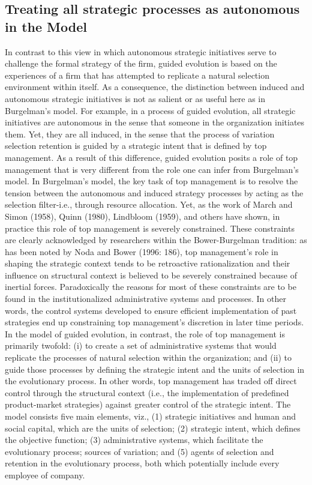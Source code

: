 \documentclass[12pt,letterpaper]{article}
\begin{document}
\subsection{Treating all strategic processes as autonomous in the \cite{Lovas2000} Model}
In contrast to this view in which autonomous strategic initiatives serve to challenge the formal strategy of the firm, guided evolution is based on the experiences of a firm that has attempted to replicate a natural selection environment within itself. As a consequence, the distinction between induced and autonomous strategic initiatives is not as salient or as useful here as in Burgelman's model. For example, in a process of guided evolution, all strategic initiatives are autonomous in the sense that someone in the organization
initiates them. Yet, they are all induced, in the sense that the process of variation selection retention is guided by a strategic intent that is
defined by top management. As a result of this difference, guided evolution posits a role of top management that is very different from the role one can infer from Burgelman's model. In Burgelman's model, the key task of top management is to resolve the tension between the autonomous and induced strategy processes by acting as the selection filter-i.e., through resource allocation. Yet, as the work of
March and Simon (1958), Quinn (1980), Lindbloom (1959), and others have shown, in practice this role of top management is severely
constrained. These constraints are clearly acknowledged by researchers within the Bower-Burgelman tradition: as has been noted by Noda and Bower (1996: 186), top management's role in shaping the strategic context tends to be retroactive rationalization and their influence on structural context is believed to be severely constrained because of inertial forces. Paradoxically the reasons for most of these constraints are to be found in the institutionalized administrative systems and processes. In other words, the control systems developed to ensure efficient implementation of past strategies end up constraining top management's discretion in later time periods.
In the model of guided evolution, in contrast, the role of top management is primarily twofold: (i) to create a set of administrative systems that would replicate the processes of natural selection within the organization; and (ii) to guide those processes by defining the strategic intent and the units of selection in the evolutionary process. In other words, top management has traded off direct control through the structural context (i.e., the implementation of predefined product-market strategies) against greater control of the strategic intent.
The model consists five main elements, viz., (1) strategic initiatives and human and social capital, which are the units of selection; (2) strategic intent, which defines the objective function; (3) administrative systems, which facilitate the evolutionary process; sources of variation; and (5) agents of selection and retention in the evolutionary process, both which potentially include every employee of company.
\end{document}
